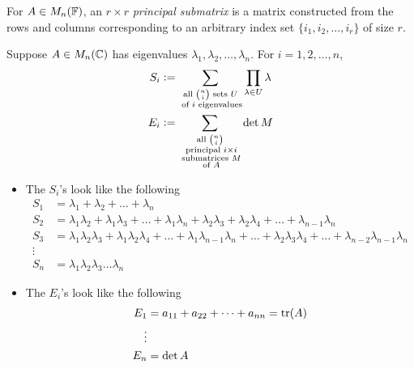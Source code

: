 \begin{definition}
\label{def:principal-submatrix}
For $A \in M_n(\mathbb F)$, an $r \times r$ \textit{principal submatrix} is a matrix constructed from the rows and columns corresponding to an arbitrary index set $\{i_1, i_2, \dots, i_r\}$ of size $r$.
\end{definition}

\begin{definition}
\label{def:s-and-e-char-poly}
Suppose $A \in M_n(\mathbb C)$ has eigenvalues $\lambda_1, \lambda_2, \dots, \lambda_n$. For $i = 1, 2, \dots, n$,
\begin{align*}
    S_i &\vcentcolon= \sum_{\substack{\text{all } \binom{n}{i} \text{ sets } U \\ \text{ of } i \text{ eigenvalues}}} \prod_{\lambda \in U} \lambda \\
    E_i &\vcentcolon= \sum_{\substack{\text{all } \binom{n}{i} \\ \text{ principal } i \times i \\ \text{ submatrices } M \\ \text{ of } A}} \det M
\end{align*}

\begin{itemize}
    \item The $S_i$'s look like the following
    \begin{align*}
        S_1 &= \lambda_1 + \lambda_2 + \dots + \lambda_n \\
        S_2 &= \lambda_1\lambda_2 + \lambda_1\lambda_3 + \dots + \lambda_1\lambda_n + \lambda_2\lambda_3 + \lambda_2\lambda_4 + \dots + \lambda_{n-1}\lambda_{n} \\
        S_3 &= \lambda_1\lambda_2\lambda_3 + \lambda_1\lambda_2\lambda_4 + \dots + \lambda_1\lambda_{n-1}\lambda_n + \dots + \lambda_2\lambda_3\lambda_4 + \dots + \lambda_{n-2}\lambda_{n-1}\lambda_n \\
        \vdots & \\
        S_n &= \lambda_1\lambda_2\lambda_3\dots\lambda_n
    \end{align*}
    \item The $E_i$'s look like the following
    \begin{align*}
        E_1 &= a_{11} + a_{22} + \dots + a_{nn} = \operatorname{tr}(A) \\
        \vdots & \\
        E_n &= \det A
    \end{align*}
\end{itemize}
\end{definition}

